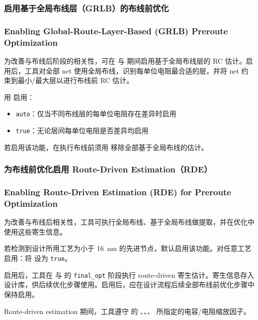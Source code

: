 \subsubsection{启用基于全局布线层（GRLB）的布线前优化}
\subsubsection*{Enabling Global-Route-Layer-Based (GRLB) Preroute Optimization}

为改善与布线后阶段的相关性，可在  与  期间启用基于全局布线层的 RC 估计。启用后，工具对全部 net 使用全局布线，识别每单位电阻最合适的层，并将 net 约束到最小/最大层以进行布线前 RC 估计。

用  启用：
\begin{itemize}
  \item \texttt{auto}：仅当不同布线层的每单位电阻存在差异时启用
  \item \texttt{true}：无论层间每单位电阻是否差异均启用
\end{itemize}

若启用该功能，在执行布线前须用  移除全部基于全局布线的估计。

\subsubsection{为布线前优化启用 Route-Driven Estimation（RDE）}
\subsubsection*{Enabling Route-Driven Estimation (RDE) for Preroute Optimization}

为改善与布线后相关性，工具可执行全局布线、基于全局布线做提取，并在优化中使用这些寄生信息。

若检测到设计所用工艺为小于 16~nm 的先进节点，默认启用该功能。对任意工艺启用：将  设为 \texttt{true}。

启用后，工具在  与  的 \texttt{final\_opt} 阶段执行 route-driven 寄生估计。寄生信息存入设计库，供后续优化步骤使用。启用后，应在设计流程后续全部布线前优化步骤中保持启用。

Route-driven estimation 期间，工具遵守  的 、、、 所指定的电容/电阻缩放因子。

